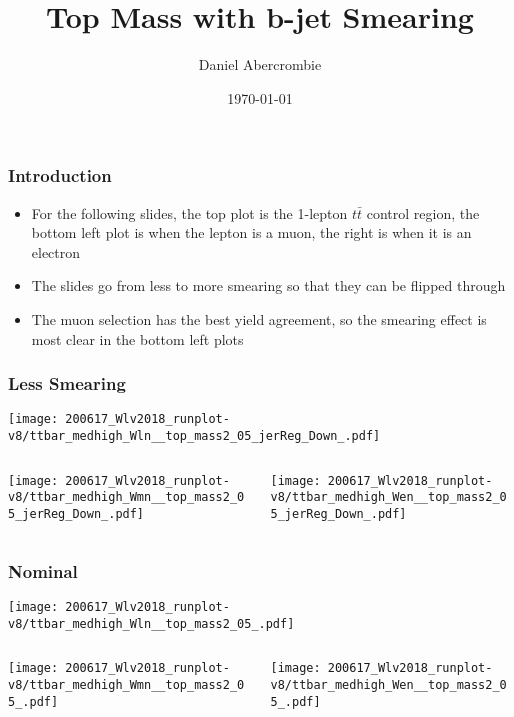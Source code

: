 \documentclass{beamer}
\author[D. Abercrombie]{
  Daniel Abercrombie
}
\title{\bf \sffamily Top Mass with b-jet Smearing}
\date{\today}
\begin{document}
\begin{frame}
  \titlepage
\end{frame}

\begin{frame}
  \frametitle{Introduction}

  \begin{itemize}
  \item For the following slides, the top plot is the 1-lepton $t\bar{t}$ control region,
    the bottom left plot is when the lepton is a muon, the right is when it is an electron
  \item The slides go from less to more smearing so that they can be flipped through
  \item The muon selection has the best yield agreement,
    so the smearing effect is most clear in the bottom left plots
  \end{itemize}

\end{frame}

\begin{frame}
  \frametitle{Less Smearing}
  \centering
  \texttt{[image: 200617\_Wlv2018\_runplot-v8/ttbar\_medhigh\_Wln\_\_top\_mass2\_05\_jerReg\_Down\_.pdf]}
  \begin{columns}
    \begin{column}{0.5\linewidth}
      \centering
      \texttt{[image: 200617\_Wlv2018\_runplot-v8/ttbar\_medhigh\_Wmn\_\_top\_mass2\_05\_jerReg\_Down\_.pdf]}
    \end{column}
    \begin{column}{0.5\linewidth}
      \centering
      \texttt{[image: 200617\_Wlv2018\_runplot-v8/ttbar\_medhigh\_Wen\_\_top\_mass2\_05\_jerReg\_Down\_.pdf]}
    \end{column}
  \end{columns}
\end{frame}

\begin{frame}
  \frametitle{Nominal}
  \centering
  \texttt{[image: 200617\_Wlv2018\_runplot-v8/ttbar\_medhigh\_Wln\_\_top\_mass2\_05\_.pdf]}
  \begin{columns}
    \begin{column}{0.5\linewidth}
      \centering
      \texttt{[image: 200617\_Wlv2018\_runplot-v8/ttbar\_medhigh\_Wmn\_\_top\_mass2\_05\_.pdf]}
    \end{column}
    \begin{column}{0.5\linewidth}
      \centering
      \texttt{[image: 200617\_Wlv2018\_runplot-v8/ttbar\_medhigh\_Wen\_\_top\_mass2\_05\_.pdf]}
    \end{column}
  \end{columns}
\end{frame}
\end{document}

